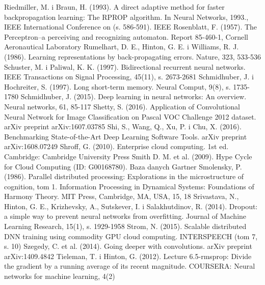 \documentclass[12pt,a4paper,twoside]{article}
\begin{document}
\begin{thebibliography}{99}
 Riedmiller, M. i Braun, H. (1993). A direct adaptive method for faster backpropagation learning: The RPROP algorithm. In Neural Networks, 1993., IEEE International Conference on (s. 586-591). IEEE
 Rosenblatt, F. (1957). The Perceptron--a perceiving and recognizing automaton. Report 85-460-1, Cornell Aeronautical Laboratory
 Rumelhart, D. E., Hinton, G. E. i Williams, R. J. (1986). Learning representations by back-propagating errors. Nature, 323, 533-536
 Schuster, M. i Paliwal, K. K. (1997). Bidirectional recurrent neural networks. IEEE Transactions on Signal Processing, 45(11), s. 2673-2681
 Schmidhuber, J. i Hochreiter, S. (1997). Long short-term memory. Neural Comput, 9(8), s. 1735-1780
 Schmidhuber, J. (2015). Deep learning in neural networks: An overview. Neural networks, 61, 85-117
 Shetty, S. (2016).  Application of Convolutional Neural Network for Image Classification on Pascal VOC Challenge 2012 dataset. arXiv preprint arXiv:1607.03785
 Shi, S., Wang, Q., Xu, P. i Chu, X. (2016). Benchmarking State-of-the-Art Deep Learning Software Tools. arXiv preprint arXiv:1608.07249
 Shroff, G. (2010). Enterprise cloud computing. 1st ed. Cambridge: Cambridge University Press
 Smith D. M. et al. (2009). Hype Cycle for Cloud Computing (ID: G00168780). Baza danych Gartner
 Smolensky, P. (1986). Parallel distributed processing: Explorations in the microstructure of cognition, tom 1. Information Processing in Dynamical Systems: Foundations of Harmony Theory. MIT Press, Cambridge, MA, USA, 15, 18
 Srivastava, N., Hinton, G. E., Krizhevsky, A., Sutskever, I. i Salakhutdinov, R. (2014). Dropout: a simple way to prevent neural networks from overfitting. Journal of Machine Learning Research, 15(1), s. 1929-1958
 Strom, N. (2015). Scalable distributed DNN training using commodity GPU cloud computing. INTERSPEECH (tom 7, s. 10)
 Szegedy, C. et al. (2014). Going deeper with convolutions. arXiv preprint arXiv:1409.4842
 Tieleman, T. i Hinton, G. (2012). Lecture 6.5-rmsprop: Divide the gradient by a running average of its recent magnitude. COURSERA: Neural networks for machine learning, 4(2)

\end{thebibliography}
\end{document}
